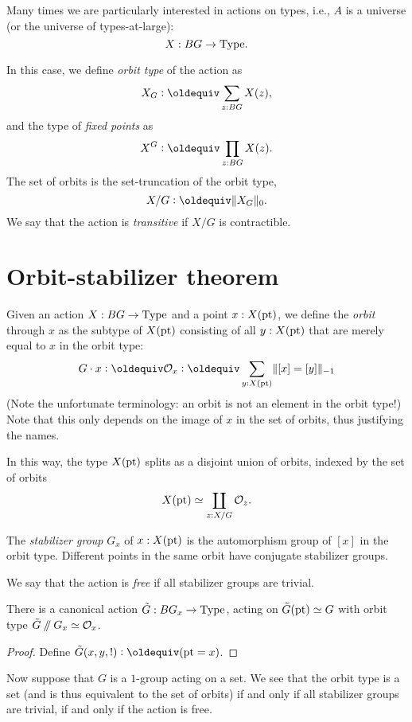 Many times we are particularly interested in actions on types,
i.e., $A$ is a universe (or the universe of types-at-large):
\[
  X : BG \to \mathord{\mathrm{Type}}.
\]

In this case, we define \emph{orbit type} of the action as
\[
  X_G \defeq \sum_{z:BG} X(z),
\]
and the type of \emph{fixed points} as
\[
  X^G \defeq \prod_{z:BG} X(z).
\]
The set of orbits is the set-truncation of the orbit type,
\[
  X / G \defeq \Trunc{X_G}_0.
\]
We say that the action is \emph{transitive} if $X / G$ is contractible.

\section{Orbit-stabilizer theorem}
\label{sec:orbit-stabilizer-theorem}

Given an action $X : BG \to \mathord{\mathrm{Type}}$ and a point $x : X({\mathord{\mathrm{pt}}})$, we define
the \emph{orbit} through $x$ as the subtype of $X({\mathord{\mathrm{pt}}})$ consisting of
all $y : X({\mathord{\mathrm{pt}}})$ that are merely equal to $x$ in the orbit type:
\[
  G\cdot x \defeq \mathcal O_x \defeq \sum_{y : X(\pt)} \merely{[x] = [y]}
\]
(Note the unfortunate terminology: an orbit is not an element in the
orbit type!)
Note that this only depends on the image of $x$ in the set of orbits,
thus justifying the names.

In this way, the type $X({\mathord{\mathrm{pt}}})$ splits as a disjoint union of orbits,
indexed by the set of orbits
\[
  X({\mathord{\mathrm{pt}}}) \simeq \coprod_{z : X / G} \mathcal O_z.
\]

The \emph{stabilizer group} $G_x$ of $x : X({\mathord{\mathrm{pt}}})$ is the automorphism group of $[x]$ in the orbit type.
Different points in the same orbit have conjugate stabilizer groups.

We say that the action is \emph{free} if all stabilizer groups are trivial.

\begin{theorem}
  There is a canonical action $\tilde G : BG_x \to \mathord{\mathrm{Type}}$,
  acting on $\tilde G({\mathord{\mathrm{pt}}})\simeq G$
  with orbit type $\tilde G\mathbin{/\kern-3pt/} G_x \simeq \mathcal O_x$.
\end{theorem}
\begin{proof}
  Define $\tilde G(x,y,!) \defeq (\pt = x)$.
\end{proof}

Now suppose that $G$ is a $1$-group acting on a set.
We see that the orbit type is a set
(and is thus equivalent to the set of orbits)
if and only if
all stabilizer groups are trivial,
\ie if and only if the action is free.


